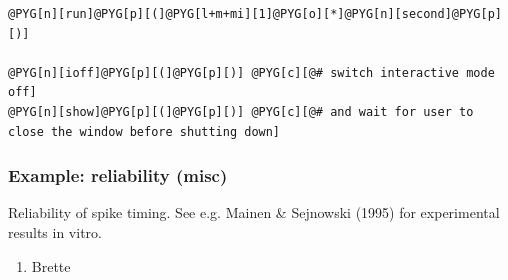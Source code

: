 \documentclass[letterpaper,10pt,english]{manual}
\begin{document}
\begin{Verbatim}[commandchars=@\[\]]
@PYG[n][run]@PYG[p][(]@PYG[l+m+mi][1]@PYG[o][*]@PYG[n][second]@PYG[p][)]

@PYG[n][ioff]@PYG[p][(]@PYG[p][)] @PYG[c][@# switch interactive mode off]
@PYG[n][show]@PYG[p][(]@PYG[p][)] @PYG[c][@# and wait for user to close the window before shutting down]
\end{Verbatim}

\resetcurrentobjects
\hypertarget{--doc-examples-misc_reliability}{}

\hypertarget{index-65}{}\subsubsection{Example: reliability (misc)}

Reliability of spike timing.
See e.g. Mainen \& Sejnowski (1995) for experimental results in vitro.
\begin{enumerate}
\item {} 
Brette

\end{enumerate}
\end{document}
